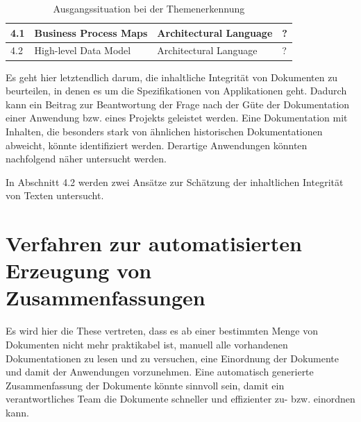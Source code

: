 \begin{table}[h]
\begin{tabular}{|l|l|l|l|}
4.1              & Business Process Maps                                                                 & Architectural Language    & ?                         \\ \hline
4.2              & High-level Data Model                                                                 & Architectural Language    & ?                         \\ \hline
\end{tabular}

\caption{Ausgangssituation bei der Themenerkennung}
\label{tab:themenerkennung}

\end{table}

Es geht hier letztendlich darum, die inhaltliche Integrität von Dokumenten zu beurteilen, in denen es um die Spezifikationen von Applikationen geht. Dadurch kann ein Beitrag zur Beantwortung der Frage nach der Güte der Dokumentation einer Anwendung bzw. eines Projekts geleistet werden. Eine Dokumentation mit Inhalten, die besonders stark von ähnlichen historischen Dokumentationen abweicht, könnte identifiziert werden. Derartige Anwendungen könnten nachfolgend näher untersucht werden. 

In Abschnitt 4.2 werden zwei Ansätze zur Schätzung der inhaltlichen Integrität von Texten untersucht.

\section{Verfahren zur automatisierten Erzeugung von Zusammenfassungen}

Es wird hier die These vertreten, dass es ab einer bestimmten Menge von Dokumenten nicht mehr praktikabel ist, manuell alle vorhandenen Dokumentationen zu lesen und zu versuchen, eine Einordnung der Dokumente und damit der Anwendungen vorzunehmen. Eine automatisch generierte Zusammenfassung der Dokumente könnte sinnvoll sein, damit ein verantwortliches Team die Dokumente schneller und effizienter zu- bzw. einordnen kann.

